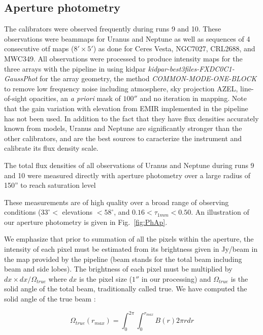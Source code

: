 

\subsection{Aperture photometry}

The calibrators were observed frequently during runs 9 and 10. These observations were beammaps for Uranus and Neptune
as well as  sequences of 4 consecutive
otf maps ($8' \times 5'$) as done for Ceres Vesta, NGC7027, CRL2688, and MWC349. All observations were processed 
to produce intensity maps for the three arrays with the pipeline  in
using kidpar
{\it kidpar-best3files-FXDC0C1-GaussPhot} for the array geometry,
the method {\it COMMON-MODE-ONE-BLOCK}  to remove
 low frequency noise including atmosphere,
sky projection AZEL, line-of-sight opacities, an {\it a priori} mask of $100''$ and no iteration in mapping.
Note that the gain variation with elevation from EMIR implemented in the pipeline has not been used. 
In addition to the fact that they  have flux densities accurately known from models,
Uranus and Neptune are significantly stronger than the other calibrators, and  are the best sources to caracterize the
instrument and calibrate its flux density  scale.

The total flux densities of all observations of Uranus and Neptune during runs 9 and 10 were
measured directly with aperture photometry over a large radius of 150'' to reach saturation level

These measurements are of high quality over a broad range of observing conditions
($33^{\circ}<$ elevations $<58^{\circ}$, and   $0.16 < \tau_{1mm} < 0.50$.
An illustration of our aperture photometry is given in Fig.~\ref{fig:PhAp}.

We emphasize that prior to summation of all the pixels within the aperture, the intensity of each pixel must be estimated
from its brightness  given in Jy/beam in the map provided by the
pipeline (beam stands  for the total beam including beam and side lobes).
The brightness of each pixel must be multiplied by
$dx \times dx / \Omega_{true}$ where  $dx$ is the pixel size ($1''$ in our processing)
and $\Omega_{true}$  is the solid angle of the total beam, traditionally called true.
We have computed the solid angle of the true beam :

$$ \Omega_{true} (r_{max}) = \int_0^{2\pi} \int_0^{r_{max}} B(r) 2 \pi r dr$$

